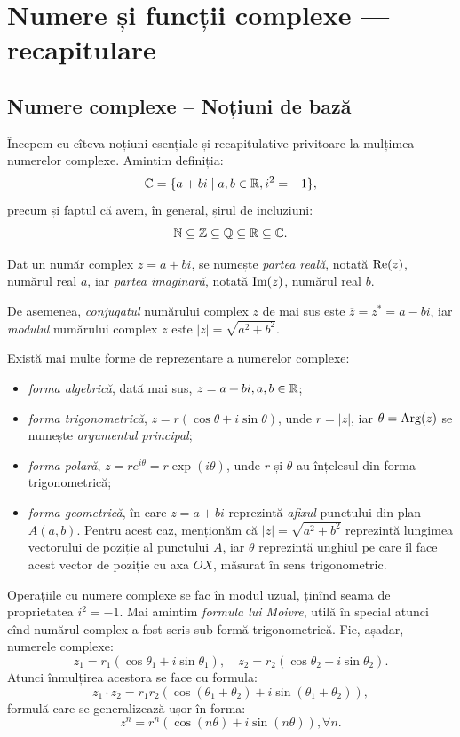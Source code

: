 
\chapter{Numere și funcții complexe --- recapitulare}

\section{Numere complexe -- Noțiuni de bază}

Începem cu cîteva noțiuni esențiale și recapitulative privitoare la mulțimea
numerelor complexe. Amintim definiția:
\[
  \mathbb{C} = \{ a + bi \mid a, b \in \mathbb{R}, i^2 = -1 \},
\]
precum și faptul că avem, în general, șirul de incluziuni:
\[
  \mathbb{N} \subseteq \mathbb{Z} \subseteq \mathbb{Q} \subseteq \mathbb{R} \subseteq \mathbb{C}.
\]

Dat un număr complex $ z = a + bi $, se numește \emph{partea reală},
notată $ \mathrm{Re}(z) $, numărul real $ a $, iar \emph{partea imaginară},
notată $ \mathrm{Im}(z) $, numărul real $ b $.

De asemenea, \emph{conjugatul} numărului complex $ z $ de mai sus este
$ \overline{z} = z^\ast = a - bi $, iar \emph{modulul} numărului complex
$ z $ este $ |z| = \sqrt{a^2 + b^2} $.

Există mai multe forme de reprezentare a numerelor complexe:
\begin{itemize}
\item \emph{forma algebrică}, dată mai sus, $ z = a + bi, a, b \in \mathbb{R} $;
\item \emph{forma trigonometrică}, $ z = r(\cos \theta + i \sin \theta) $,
  unde $ r = |z| $, iar $ \theta = \mathrm{Arg}(z) $ se numește \emph{argumentul %
  principal};
\item \emph{forma polară}, $ z = r e^{i\theta} = r \exp(i \theta) $, unde
  $ r $ și $ \theta $ au înțelesul din forma trigonometrică;
\item \emph{forma geometrică}, în care $ z = a + bi $ reprezintă
  \emph{afixul} punctului din plan $ A(a, b) $. Pentru acest caz, menționăm
  că $ |z| = \sqrt{a^2 + b^2} $ reprezintă lungimea vectorului de poziție
  al punctului $ A $, iar $ \theta $ reprezintă unghiul pe care îl face
  acest vector de poziție cu axa $ OX $, măsurat în sens trigonometric.
\end{itemize}

Operațiile cu numere complexe se fac în modul uzual, ținînd seama de
proprietatea $ i^2 = -1 $. Mai amintim \emph{formula lui Moivre}, utilă
în special atunci cînd numărul complex a fost scris sub formă trigonometrică.
Fie, așadar, numerele complexe:
\[
  z_1 = r_1(\cos \theta_1 + i\sin\theta_1), \quad %
  z_2 = r_2(\cos \theta_2 + i \sin\theta_2).
\]
Atunci înmulțirea acestora se face cu formula:
\[
  z_1 \cdot z_2 = r_1r_2 \left( \cos(\theta_1 + \theta_2) + i \sin(\theta_1 + \theta_2) \right),
\]
formulă care se generalizează ușor în forma:
\[
  z^n = r^n(\cos (n\theta) + i \sin (n\theta)), \forall n.
\]

